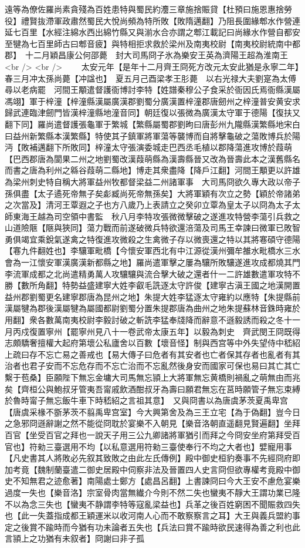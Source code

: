 遠等為僚佐羅尚素貪殘為百姓患特與蜀民約灋三章施捨賑貸【杜預曰施恩惠捨勞役】禮賢抜滯軍政肅然蜀民大悅尚頻為特所敗【敗隋邁翻】乃阻長圍緣郫水作營連延七百里【水經注綿水西出綿竹縣又與湔水合亦謂之郫江載記曰尚緣水作營自都安至犍為七百里師古曰郫音疲】與特相拒求救於梁州及南夷校尉【南夷校尉統南中都郡】　十二月穎昌康公何邵薨　封大司馬冏子氷為樂安王英為濟陽王超為淮南王<br />
<br />
　　太安元年【是年十二月齊王冏死方改元太安此猶是永寧二年】春三月冲太孫尚薨【冲諡也】　夏五月己酉梁孝王肜薨　以右光禄大夫劉寔為太傅尋以老病罷　河間王顒遣督護衙博討李特【姓譜秦穆公子食采於衙因氏焉衙縣漢屬馮翊】軍于梓潼【梓潼縣漢屬廣漢郡劉蜀分廣漢置梓潼郡唐劒州之梓潼普安黄安求歸武連臨津劒門皆漢梓潼縣地潼音同】朝廷復以張微為廣漢太守軍于德陽【復扶又翻下同】羅尚遣督護張龜軍于繁城【繁縣屬蜀郡劉昫曰唐彭州九隴縣漢繁縣地宋白曰益州新繁縣本漢繁縣】特使其子鎮軍將軍蕩等襲博而自將擊龜破之蕩敗博兵於陽沔【敗補邁翻下所敗同】梓潼太守張演委城走巴西丞毛植以郡降蕩進攻博於葭萌【巴西郡唐為閬果二州之地劉蜀改漢葭萌縣為漢壽縣晉又改為晉壽此本之漢舊縣名而書之唐為利州之緜谷葭萌二縣地】博走其衆盡降【降戶江翻】河間王顒更以許雄為梁州刺史特自稱大將軍益州牧都督梁益二州諸軍事　大司馬冏欲久專大政以帝子孫俱盡【太子遹死帝無子矣虨臧尚死帝無孫矣】大將軍穎有次立之勢【穎於帝諸弟之次當及】清河王覃遐之子也方八歲乃上表請立之癸卯立覃為皇太子以冏為太子太師東海王越為司空領中書監　秋八月李特攻張微微擊破之遂進攻特營李蕩引兵救之山道險陿【陿與狹同】蕩力戰而前遂破微兵特欲還涪蕩及司馬王幸諫曰微軍已敗智勇俱竭宜乘銳氣遂禽之特復進攻微殺之生禽微子存以微喪還之特以其將寋碩守德陽【寋九件翻姓也】李驤軍毗橋【今懷安軍西北有中江源從漢州彌牟雒水毗橋水三水會為一江懷安軍漢廣漢新都縣之地】羅尚遣軍擊之屢為驤所敗驤遂進攻成都燒其門李流軍成都之北尚遣精勇萬人攻驤驤與流合擊大破之還者什一二許雄數遣軍攻特不勝【數所角翻】特勢益盛建寧大姓李叡毛詵逐太守許俊【建寧古滇王國之地漢開置益州郡劉蜀更名建寧郡唐為昆州之地】朱提大姓李猛逐太守雍約以應特【朱提縣前漢屬犍為郡後漢屬犍為屬國都尉劉蜀分置朱提郡唐為曲州之地朱提蘇林音銖時雍於用翻】衆各數萬南夷校尉李毅討破之斬詵李猛奉牋降而辭意不遜毅誘而殺之冬十一月丙戍復置寧州【罷寧州見八十一卷武帝太康五年】以毅為刺史　齊武閔王冏既得志頗驕奢擅權大起府第壞公私廬舍以百數【壞音怪】制與西宫等中外失望侍中嵇紹上疏曰存不忘亡易之善戒也【易大傳子曰危者有其安者也亡者保其存者也亂者有其治者也君子安而不忘危存而不忘亡治而不忘亂然後身安而國家可保也易曰其亡其亡繫于苞桑】臣願陛下無忘金墉大司馬無忘頴上大將軍無忘黄橋則禍亂之萌無由而兆矣【齊桓公與鮑叔牙管夷吾甯戚飲酒酣叔牙為壽曰願君無忘在莒時願管子無忘束縛於魯時甯子無忘飯牛車下時嵇紹之言祖其意】　又與冏書以為唐虞茅茨夏禹卑宫【唐虞采椽不斵茅茨不翦禹卑宫室】今大興第舍及為三王立宅【為于偽翻】豈今日之急邪冏遜辭謝之然不能從冏耽於宴樂不入朝見【樂音洛朝直遥翻見賢遍翻】坐拜百官【坐受百官之拜也一說天子用三公九卿諸將軍猶引而拜之今冏安坐府第拜受百官也】符勑三臺選用不均【以私意選用符勑三臺使奉行不均之大者也】嬖寵用事【凡史書其人將敗必先叙其致敗之由此左氏傳例】殿中御史桓豹奏事不先經冏府即加考竟【魏制蘭臺遣二御史居殿中伺察非法及晉置四人史言冏但欲專權考竟殿中御史不知無君之迹愈著】南陽處士鄭方【處昌呂翻】上書諫冏曰今大王安不慮危宴樂過度一失也【樂音洛】宗室骨肉當無纎介今則不然二失也蠻夷不靜大王謂功業已隆不以為念三失也【蠻夷不静謂李特等寇亂梁益也】兵革之後百姓窮困不聞賑救四失也【此一失蓋指成都王穎運米以收河南人心而不敢察察言之耳】大王與義兵盟約事定之後賞不踰時而今猶有功未論者五失也【兵法曰賞不踰時欲民速得為善之利也此言頴上之功猶有未叙者】冏謝曰非子孤